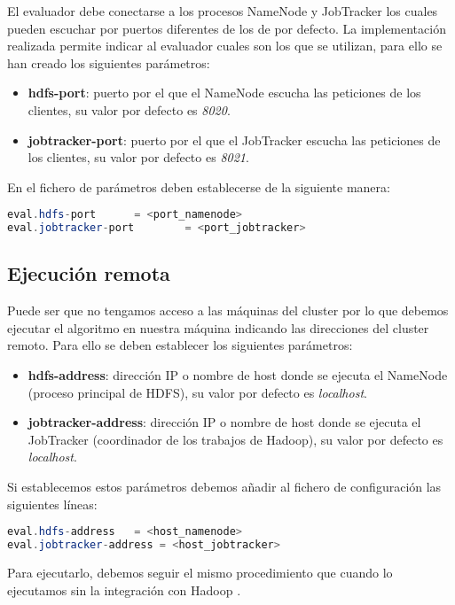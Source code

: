 El evaluador debe conectarse a los procesos NameNode y JobTracker los cuales pueden escuchar por puertos diferentes de los de por defecto. La implementaci\'on realizada permite indicar al evaluador cuales son los que se utilizan, para ello se han creado los siguientes par\'ametros:

\begin{itemize}
	\item \textbf{hdfs-port}: puerto por el que el NameNode escucha las peticiones de los clientes, su valor por defecto es \textit{8020}.
	\item \textbf{jobtracker-port}: puerto por el que el JobTracker escucha las peticiones de los clientes, su valor por defecto es \textit{8021}.
\end{itemize}

En el fichero de par\'ametros deben establecerse de la siguiente manera:

\begin{lstlisting}[language=Java]
eval.hdfs-port		= <port_namenode>
eval.jobtracker-port		= <port_jobtracker>
\end{lstlisting}

\subsection{Ejecuci\'on remota}

Puede ser que no tengamos acceso a las m\'aquinas del cluster por lo que debemos ejecutar el algoritmo en nuestra m\'aquina indicando las direcciones del cluster remoto. Para ello se deben establecer los siguientes par\'ametros:

\begin{itemize}
	\item \textbf{hdfs-address}: direcci\'on IP o nombre de host donde se ejecuta el NameNode (proceso principal de HDFS), su valor por defecto es \textit{localhost}.
	\item \textbf{jobtracker-address}: direcci\'on IP o nombre de host donde se ejecuta el JobTracker (coordinador de los trabajos de Hadoop), su valor por defecto es \textit{localhost}.
\end{itemize}

Si establecemos estos par\'ametros debemos a\~nadir al fichero de configuraci\'on las siguientes l\'ineas:

\begin{lstlisting}[language=Java]
eval.hdfs-address	= <host_namenode>
eval.jobtracker-address	= <host_jobtracker>
\end{lstlisting}

Para ejecutarlo, debemos seguir el mismo procedimiento que cuando lo ejecutamos sin la integraci\'on con Hadoop .